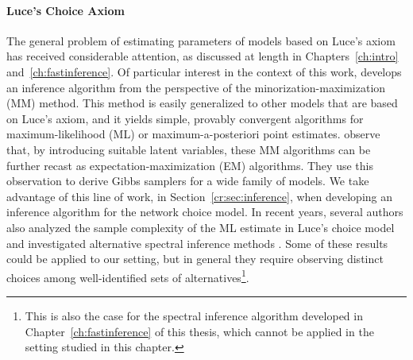 \paragraph{Luce's Choice Axiom}
The general problem of estimating parameters of models based on Luce's axiom has received considerable attention, as discussed at length in Chapters~\ref{ch:intro} and~\ref{ch:fastinference}.
Of particular interest in the context of this work, \citet{hunter2004mm} develops an inference algorithm from the perspective of the minorization-maximization (MM) method.
This method is easily generalized to other models that are based on Luce's axiom, and it yields simple, provably convergent algorithms for maximum-likelihood (ML) or maximum-a-posteriori point estimates.
\citet{caron2012efficient} observe that, by introducing suitable latent variables, these MM algorithms can be further recast as expectation-maximization (EM) algorithms.
They use this observation to derive Gibbs samplers for a wide family of models.
We take advantage of this line of work, in Section~\ref{cr:sec:inference}, when developing an inference algorithm for the network choice model.
In recent years, several authors also analyzed the sample complexity of the ML estimate in Luce's choice model \citep{hajek2014minimax, vojnovic2016parameter} and investigated alternative spectral inference methods \citep{negahban2012iterative, azari2013generalized}.
Some of these results could be applied to our setting, but in general they require observing distinct choices among well-identified sets of alternatives\footnote{%
This is also the case for the spectral inference algorithm developed in Chapter~\ref{ch:fastinference} of this thesis, which cannot be applied in the setting studied in this chapter.
}.

